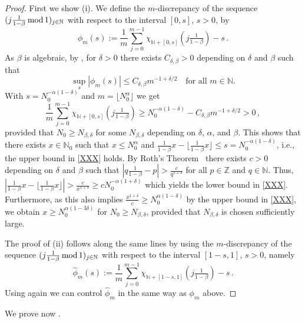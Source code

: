 \documentclass[reqno]{amsart}
\theoremstyle{plain}
\theoremstyle{definition}
\numberwithin{equation}{section}
\newcommand{\N}{\mathbb{N}}
\newcommand{\Z}{\mathbb{Z}}
\begin{document}
\begin{proof} First we show {\rm (i)}.
We define the $m$-discrepancy of the sequence $(j  \frac{1}{1-\beta}     \, {\rm mod} \, 1)_{j \in \N}$ with respect to the interval $[0,s]$, $s>0$, by
$${\phi_m(s) := \frac{1}{m} \sum_{j=0}^{m-1}  \chi_{\N + [0,s]}  (j \tfrac{1}{1-\beta})   -s\,.} $$
As $\beta$ is algebraic, by \cite[Thm.\ 3.2 and Ex.\ 3.1, pp.\ 123-124]{Kuipers},  for $\delta >0$ there exists $C_{\delta,\beta}>0$ depending on $\delta$ and $\beta$ such that
$$\sup_s |\phi_m(s)| \le C_{\delta,\beta} m^{-1+\delta/2} \quad \text{for all $m \in \N$}. $$
With $s =  N_0^{-\alpha(1-\delta)}$ and $m = \lfloor N_0^{\alpha} \rfloor$ we get 
$$ {\frac{1}{m} \sum_{j=0}^{m-1}  \chi_{\N + [0,s]}  (j \tfrac{1}{1-\beta})  \ge  N_0^{-\alpha (1-\delta)} - C_{\delta,\beta} m^{-1+\delta/2} >0\,, }$$
provided that $N_0 \ge N_{\beta,\delta} $ for some $ N_{\beta,\delta}  $ depending on $\delta$, $\alpha$, and $\beta$. 
This shows that there exists $x \in \N_0$ such that $x \le N_0^\alpha$ and  $  \frac{1}{1-\beta }    x - \lfloor   \frac{1}{1-\beta }   x \rfloor  \le s= N_0^{-\alpha (1-\delta)}$,  i.e., the upper bound in \eqref{XXX} holds. By Roth's Theorem~\cite{Roth} there exists $c>0$ depending on $\delta$ and $\beta$ such that $|  q \frac{1}{1-\beta}      - p  | > \frac{c}{q^{1+\delta}}$ for all $p \in \Z$ and $q \in \N$. Thus,  $| \frac{1}{1-\beta }    x - \lfloor   \frac{1}{1-\beta }    x \rfloor | > \frac{c}{x^{1+\delta}} \geq cN_0^{-\alpha(1+\delta)}$  which yields  the lower bound    in \eqref{XXX}.  Furthermore, as this also implies $\frac{x^{1+\delta}}{c} \ge N_0^{\alpha (1-\delta)}$  by the upper bound in \eqref{XXX}, we obtain $x \ge N_0^{\alpha (1-3\delta)}$ for $N_0 \ge  N_{\beta,\delta} $, provided that $ N_{\beta,\delta} $ is chosen sufficiently large.

The proof of {\rm (ii)} follows along the same lines by using the $m$-discrepancy of the sequence $(j\frac{1}{1-\beta}     \, {\rm mod} \, 1)_{j \in \N}$ with respect to the interval $[1-s,1]$, $s>0$, namely
$$\hat\phi_m(s) := \frac{1}{m} \sum_{j=0}^{m-1}  \chi_{\N + [1-s,1]}  (j \tfrac{1}{1-\beta})   -s\,. $$
 Using again \cite{Kuipers} we can control $\hat\phi_m$ in the same way as $\phi_m$ above.  
\end{proof}

 We prove now . 
\end{document}
